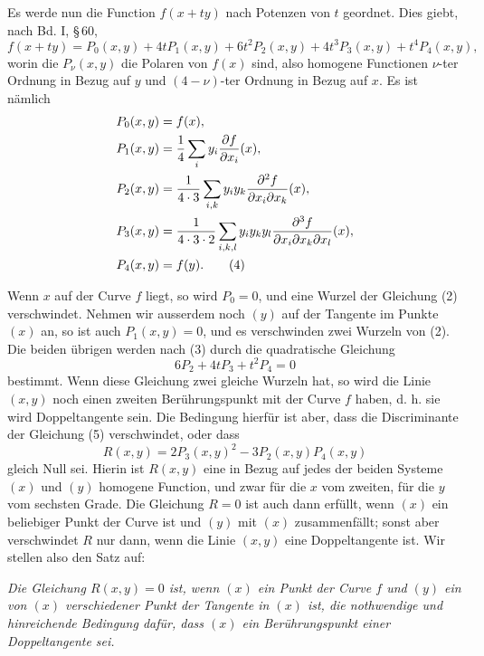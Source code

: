 \documentclass[11pt]{article}
\begin{document}
Es werde nun die Function \(f(x+t y)\) nach Potenzen von \(t\) geordnet. Dies giebt, nach Bd. I, \S\,60,
\begin{equation}
 f(x+t y)=P_0(x,y)+4tP_1(x,y)+6t^2P_2(x,y)+4t^3P_3(x,y)+t^4P_4(x,y),
 \tag{3}
\end{equation}
worin die \(P_\nu(x,y)\) die Polaren von \(f(x)\) sind, also homogene Functionen \(\nu\)-ter Ordnung in Bezug auf \(y\) und \((4-\nu)\)-ter Ordnung in Bezug auf \(x\). Es ist nämlich
\begin{align}
 P_0(x,y)&=f(x),\notag\\
 P_1(x,y)&=\frac14\sum_i y_i\frac{\partial f}{\partial x_i}(x),\notag\\
 P_2(x,y)&=\frac1{4\cdot3}\sum_{i,k}y_i y_k\frac{\partial^2 f}{\partial x_i\partial x_k}(x),\notag\\
 P_3(x,y)&=\frac1{4\cdot3\cdot2}\sum_{i,k,l}y_i y_k y_l\frac{\partial^3 f}{\partial x_i\partial x_k\partial x_l}(x),\notag\\
 P_4(x,y)&=f(y).
 \tag{4}
\end{align}

Wenn \(x\) auf der Curve \(f\) liegt, so wird \(P_0=0\), und eine Wurzel der Gleichung (2) verschwindet. Nehmen wir ausserdem noch \((y)\) auf der Tangente im Punkte \((x)\) an, so ist auch \(P_1(x,y)=0\), und es verschwinden zwei Wurzeln von (2). Die beiden übrigen werden nach (3) durch die quadratische Gleichung
\begin{equation}
 6P_2+4tP_3+t^2P_4=0
 \tag{5}
\end{equation}
bestimmt. Wenn diese Gleichung zwei gleiche Wurzeln hat, so wird die Linie \((x,y)\) noch einen zweiten Berührungspunkt mit der Curve \(f\) haben, d. h. sie wird Doppeltangente sein. Die Bedingung hierfür ist aber, dass die Discriminante der Gleichung (5) verschwindet, oder dass
\begin{equation}
 R(x,y)=2P_3(x,y)^2-3P_2(x,y)P_4(x,y)
 \tag{6}
\end{equation}
gleich Null sei. Hierin ist \(R(x,y)\) eine in Bezug auf jedes der beiden Systeme \((x)\) und \((y)\) homogene Function, und zwar für die \(x\) vom zweiten, für die \(y\) vom sechsten Grade. Die Gleichung \(R=0\) ist auch dann erfüllt, wenn \((x)\) ein beliebiger Punkt der Curve ist und \((y)\) mit \((x)\) zusammenfällt; sonst aber verschwindet \(R\) nur dann, wenn die Linie \((x,y)\) eine Doppeltangente ist. Wir stellen also den Satz auf:

\emph{Die Gleichung \(R(x,y)=0\) ist, wenn \((x)\) ein Punkt der Curve \(f\) und \((y)\) ein von \((x)\) verschiedener Punkt der Tangente in \((x)\) ist, die nothwendige und hinreichende Bedingung dafür, dass \((x)\) ein Berührungspunkt einer Doppeltangente sei.}
\end{document}
